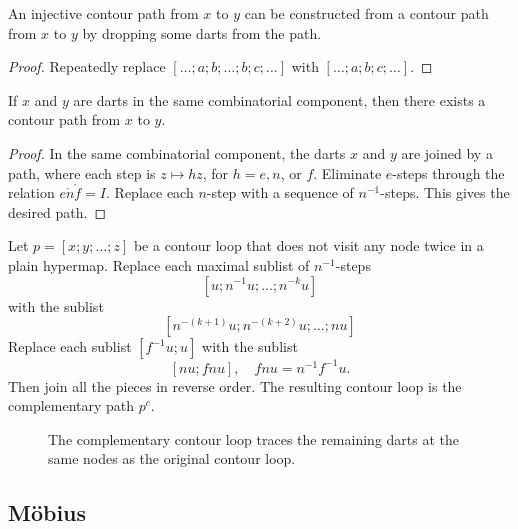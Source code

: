 \begin{lemma} An injective contour path from $x$ to $y$ can be constructed from a contour path from $x$ to $y$ by dropping some darts from the path.
\end{lemma}

\begin{proof} Repeatedly replace $[\ldots;a;b;\ldots;b;c;\ldots]$ with
$[\ldots;a;b;c;\ldots]$.
\end{proof}





\begin{lemma}  
If $x$ and $y$ are darts in the same combinatorial component, then there exists a contour path from $x$ to $y$.
\end{lemma}

\begin{proof} 
In the same combinatorial component, the darts $x$ and $y$ are joined by a path, where each step is $z\mapsto h z$, for $h=e,n$, or $f$.  Eliminate $e$-steps through the relation $e\ocirc n\ocirc f = I$.   Replace each $n$-step with a sequence of $n^{-1}$-steps.  This gives the desired path.
\end{proof}


\begin{definition} 
Let $p=[x;y;\ldots;z]$ be a contour loop that does not visit any node twice in a plain hypermap.   Replace each maximal sublist of $n^{-1}$-steps
$$
[u;n^{-1} u; \ldots; n^{-k} u]
$$
with the sublist
$$
[n^{-(k+1)} u;n^{-(k+2)} u;\ldots; n u]
$$
Replace each sublist $[f^{-1} u;u]$ with the sublist
$$
[n u; f n u],\quad f n u = n^{-1} f^{-1} u.
$$
Then join all the pieces in reverse order. The resulting contour loop is the complementary path $p^c$.
\end{definition}

\begin{figure}[htb]
  \centering
  \caption{The complementary contour loop traces the remaining darts
   at the same nodes as the original contour loop. }
  \label{fig:contour-comp}
\end{figure}

\subsection{M\"obius}

